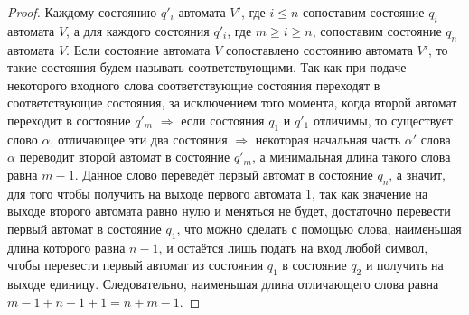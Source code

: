 \documentclass[a4paper, 12pt]{article}
\theoremstyle{definition}
\theoremstyle{plain}
\theoremstyle{remark}
\begin{document}
\begin{proof}
    Каждому состоянию $q'_i$ автомата $V'$, где $i\leqslant n$ сопоставим состояние $q_i$ автомата $V$, а для каждого состояния $q'_i$, где $m\geq i\geq n$, сопоставим состояние $q_n$ автомата $V$. Если состояние автомата $V$ сопоставлено состоянию автомата $V'$, то такие состояния будем называть соответствующими. Так как при подаче некоторого входного слова соответствующие состояния переходят в соответствующие состояния, за исключением того момента, когда второй автомат переходит в состояние $q'_m$ $\Longrightarrow$ если состояния $q_1$ и $q'_1$ отличимы, то существует слово $\alpha$, отличающее эти два состояния $\Longrightarrow$ некоторая начальная часть $\alpha'$ слова $\alpha$ переводит второй автомат в состояние $q'_m$, а минимальная длина такого слова равна $m-1$. Данное слово переведёт первый автомат в состояние $q_n$, а значит, для того чтобы получить на выходе первого автомата 1, так как значение на выходе второго автомата равно нулю и меняться не будет, достаточно перевести первый автомат в состояние $q_1$, что можно сделать с помощью слова, наименьшая длина которого равна $n-1$, и остаётся лишь подать на вход любой символ, чтобы перевести первый автомат из состояния $q_1$ в состояние $q_2$ и получить на выходе единицу. Следовательно, наименьшая длина отличающего слова равна $m-1+n-1+1=n+m-1$.
  \end{proof}
\end{document}
